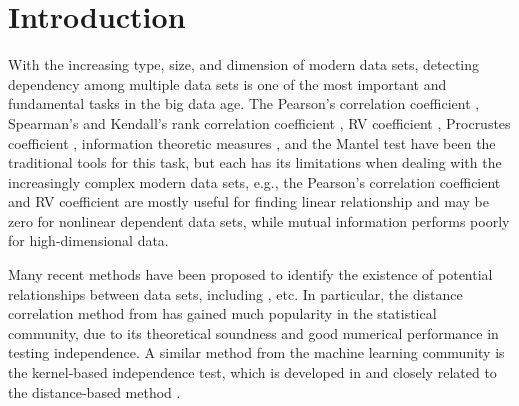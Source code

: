 \documentclass[11pt]{article}
\begin{document}
\clearpage
\tableofcontents


\newpage
{}

\section{Introduction}
\label{sec:intro}
With the increasing type, size, and dimension of modern data sets, detecting dependency among multiple data sets is one of the most important and fundamental tasks in the big data age. The Pearson's correlation coefficient \cite{Pearson1895}, Spearman's and Kendall's rank correlation coefficient \cite{KendallBook}, RV coefficient \cite{RobertEscoufier1976}, Procrustes coefficient \cite{GowerProcrustesBook}, information theoretic measures \cite{Renyi1959}, and the Mantel test \cite{Mantel1967} have been the traditional tools for this task, but each has its limitations when dealing with the increasingly complex modern data sets, e.g., the Pearson's correlation coefficient and RV coefficient are mostly useful for finding linear relationship and may be zero for nonlinear dependent data sets, while mutual information performs poorly for high-dimensional data. 

Many recent methods have been proposed to identify the existence of potential relationships between data sets, including \cite{Baringhaus2004,TaskinenOjaRandles2005, GrettonEtAl2005, SzekelyRizzoBakirov2007, GrettonGyorfi2010,Reshef2011, HellerGorfine2013, Reimherr2013, SzekelyRizzo2013a, SzekelyRizzo2013b, RizzoSzekely2016,HHG2016}, etc. In particular, the distance correlation method from \cite{SzekelyRizzoBakirov2007, SzekelyRizzo2009, SzekelyRizzo2013a, SzekelyRizzo2014} has gained much popularity in the statistical community, due to its theoretical soundness and good numerical performance in testing independence. A similar method from the machine learning community is the kernel-based independence test, which is developed in \cite{GrettonEtAl2005, GrettonGyorfi2010, GrettonEtAl2012} and closely related to the distance-based method \cite{SejdinovicEtAl2013, RamdasEtAl2015}.
\end{document}
